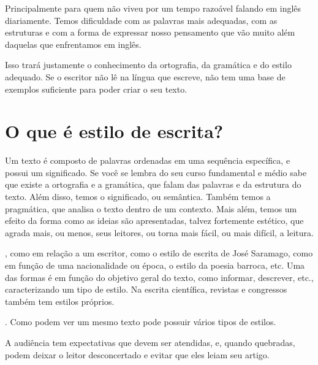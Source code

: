 \documentclass{article}
\begin{document}
 Principalmente para quem não viveu por um tempo razoável falando em inglês diariamente. Temos dificuldade com as palavras mais adequadas, com as estruturas e com a forma de expressar nosso pensamento que vão muito além daquelas que enfrentamos em inglês.

 Isso trará justamente o conhecimento da ortografia, da gramática e do estilo adequado. Se o escritor não lê na língua que escreve, não tem uma base de exemplos suficiente para poder criar o seu texto.


\section{O que é estilo de escrita?}

 Um texto é composto de palavras ordenadas em uma sequência específica, e possui um significado. Se você se lembra do seu curso fundamental e médio sabe que existe a ortografia e a gramática, que falam das palavras e da estrutura do texto. Além disso, temos o significado, ou semântica. Também temos a pragmática, que analisa o texto dentro de um contexto. Mais além, temos um efeito da forma como as ideias são apresentadas, talvez fortemente estético, que agrada mais, ou menos, seus leitores, ou torna mais fácil, ou mais difícil, a leitura. 

, como em relação a um escritor, como o estilo de escrita de José Saramago, como em função de uma nacionalidade ou época, o estilo da poesia barroca, etc. Uma das formas é em função do objetivo geral do texto, como informar, descrever, etc., caracterizando um tipo de estilo. Na escrita científica, revistas e congressos também tem estilos próprios. 

\citep{jeffrey:2016}. 
Como podem ver um mesmo texto pode possuir vários tipos de estilos.

 A audiência tem expectativas que devem ser atendidas, e, quando quebradas, podem deixar o leitor desconcertado e evitar que eles leiam seu artigo.
\end{document}
